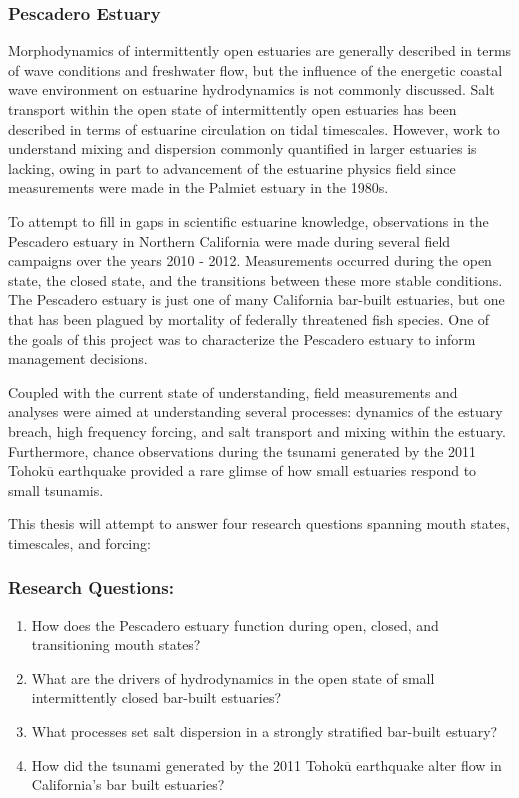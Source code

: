 \subsubsection{Pescadero Estuary} 
Morphodynamics of intermittently open estuaries are generally described in terms of wave conditions and freshwater flow, but the influence of the energetic coastal wave environment on estuarine hydrodynamics is not commonly discussed. Salt transport within the open state of intermittently open estuaries has been described in terms of estuarine circulation on tidal timescales. However, work to understand mixing and dispersion commonly quantified in larger estuaries is lacking, owing in part to advancement of the estuarine physics field since measurements were made in the Palmiet estuary in the 1980s. 


To attempt to fill in gaps in scientific estuarine knowledge, observations in the Pescadero estuary in Northern California were made during several field campaigns over the years 2010 - 2012. Measurements occurred during the open state, the closed state, and the transitions between these more stable conditions. The Pescadero estuary is just one of many California bar-built estuaries, but one that has been plagued by mortality of federally threatened fish species. One of the goals of this project was to characterize the Pescadero estuary to inform management decisions. 

Coupled with the current state of understanding, field measurements and analyses were aimed at understanding several processes: dynamics of the estuary breach, high frequency forcing, and salt transport and mixing within the estuary. Furthermore, chance observations during the tsunami generated by the 2011 Tohok$\overline{\mathrm{u}}$ earthquake provided a rare glimse of how small estuaries respond to small tsunamis. 

This thesis will attempt to answer four research questions spanning mouth states, timescales, and forcing: 


\subsubsection{Research Questions:}
\begin{enumerate}
	\item{How does the Pescadero estuary function during open, closed, and transitioning mouth states?}
	\item{What are the drivers of hydrodynamics in the open state of small intermittently closed bar-built estuaries?}
	\item{What processes set salt dispersion in a strongly stratified bar-built estuary?}
	\item{How did the tsunami generated by the 2011 Tohok$\overline{\mathrm{u}}$ earthquake alter flow in California's bar built estuaries?}
\end{enumerate}


